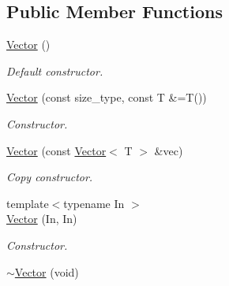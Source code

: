 \subsection*{Public Member Functions}
\begin{DoxyCompactItemize}
\item 
\hyperlink{classtasks_1_1Vector_a49dcfa19a8d9f56937eb237ddf15e269}{Vector} ()\hypertarget{classtasks_1_1Vector_a49dcfa19a8d9f56937eb237ddf15e269}{}\label{classtasks_1_1Vector_a49dcfa19a8d9f56937eb237ddf15e269}

\begin{DoxyCompactList}\small\item\em Default constructor. \end{DoxyCompactList}\item 
\hyperlink{classtasks_1_1Vector_aa3510d21ad001f419765671ae3b59b74}{Vector} (const size\+\_\+type, const T \&=T())
\begin{DoxyCompactList}\small\item\em Constructor. \end{DoxyCompactList}\item 
\hyperlink{classtasks_1_1Vector_ad15612a20fc0fe8bcee091f88afb815b}{Vector} (const \hyperlink{classtasks_1_1Vector}{Vector}$<$ T $>$ \&vec)
\begin{DoxyCompactList}\small\item\em Copy constructor. \end{DoxyCompactList}\item 
{\footnotesize template$<$typename In $>$ }\\\hyperlink{classtasks_1_1Vector_abebeb436f55f0456983c3750329ddfa4}{Vector} (In, In)
\begin{DoxyCompactList}\small\item\em Constructor. \end{DoxyCompactList}\item 
\hyperlink{classtasks_1_1Vector_a3ff1d78c67fbcc382d45e071573de22d}{$\sim$\+Vector} (void)\hypertarget{classtasks_1_1Vector_a3ff1d78c67fbcc382d45e071573de22d}{}\label{classtasks_1_1Vector_a3ff1d78c67fbcc382d45e071573de22d}


\end{DoxyCompactItemize}
